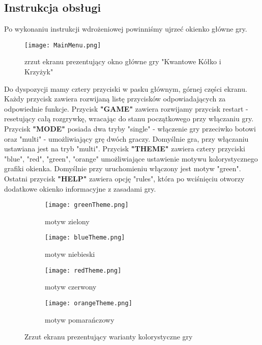 \documentclass{article}
\begin{document}
\newpage
\subsection{Instrukcja obsługi}
Po wykonaniu instrukcji wdrożeniowej powinniśmy ujrzeć okienko główne gry.

\begin{figure}[h]
\centering
\texttt{[image: MainMenu.png]}\\
\caption{zrzut ekranu prezentujący okno główne gry "Kwantowe Kółko i Krzyżyk"}
\end{figure}

Do dyspozycji mamy cztery przyciski w pasku głównym, górnej części ekranu. Każdy przycisk zawiera rozwijaną listę przycisków odpowiadających za odpowiednie funkcje. Przycisk \textbf{"GAME"} zawiera rozwijamy przycisk restart - resetujący całą rozgrywkę, wracając do stanu początkowego przy włączaniu gry. Przycisk \textbf{"MODE"} posiada dwa tryby "single" - włączenie gry przeciwko botowi oraz "multi" - umożliwiający grę dwóch graczy. Domyślnie gra, przy włączaniu ustawiana jest na tryb "multi". Przycisk \textbf{"THEME"} zawiera cztery przyciski "blue", "red", "green", "orange" umożliwiające ustawienie motywu kolorystycznego grafiki okienka. Domyślnie przy uruchomieniu włączony jest motyw "green". Ostatni przycisk \textbf{"HELP"} zawiera opcję "rules", która po wciśnięciu otworzy dodatkowe okienko informacyjne z zasadami gry.
\newpage

\begin{figure}[ht]
\begin{subfigure}{.5\textwidth}
  \centering
  \texttt{[image: greenTheme.png]}  
  \caption{motyw zielony}
  \label{fig:sub-first}
\end{subfigure}
\begin{subfigure}{.5\textwidth}
  \centering
  \texttt{[image: blueTheme.png]}  
  \caption{motyw niebieski}
  \label{fig:sub-second}
\end{subfigure}
\begin{subfigure}{.5\textwidth}
  \centering
  \texttt{[image: redTheme.png]}  
  \caption{motyw czerwony}
  \label{fig:sub-first}
\end{subfigure}
\begin{subfigure}{.5\textwidth}
  \centering
  \texttt{[image: orangeTheme.png]}  
  \caption{motyw pomarańczowy}
  \label{fig:sub-second}
\end{subfigure}
\caption{Zrzut ekranu prezentujący warianty kolorystyczne gry}
\label{fig:fig}
\end{figure}
\end{document}
